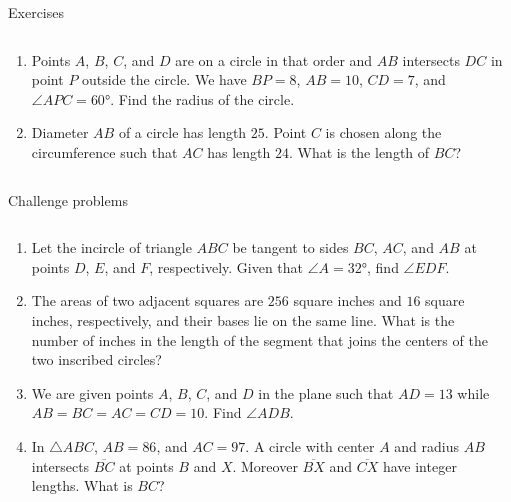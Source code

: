 \documentclass[9pt,aspectratio=169]{beamer}
\begin{document}
\begin{frame}{Exercises}
\begin{columns}[T]
\begin{column}{0.5\textwidth}
\begin{enumerate}
        \item Points $A$, $B$, $C$, and $D$ are on a circle in that order and $AB$ intersects $DC$ in point $P$ outside the circle. We have $BP = 8$, $AB = 10$, $CD = 7$, and $\angle APC = 60°$. Find the radius of the circle.
        \item Diameter $AB$ of a circle has length $25$.  Point $C$ is chosen along the circumference such that $AC$ has length $24$.  What is the length of $BC$?     
      \end{enumerate}
    \end{column}
  \end{columns}
\end{frame}

\begin{frame}{Challenge problems}
  \begin{columns}[T]
    \begin{column}{0.5\textwidth}
      \begin{enumerate}
        \item Let the incircle of triangle $ABC$ be tangent to sides $BC$, $AC$, and $AB$ at points $D$, $E$, and $F$, respectively. Given that $\angle A = 32°$, find $\angle EDF$.
        \item The areas of two adjacent squares are $256$ square inches and $16$ square inches,
        respectively, and their bases lie on the same line. What is the number of inches in
        the length of the segment that joins the centers of the two inscribed circles? 
        \item We are given points $A$, $B$, $C$, and $D$ in the plane such that $AD = 13$ while $AB = BC = AC= CD = 10$. Find $\angle ADB$.
        \item In $\triangle ABC$, $AB = 86$, and $AC=97$. A circle with center $A$ and radius $AB$ intersects $\overline{BC}$ at points $B$ and $X$. Moreover $\overline{BX}$ and $\overline{CX}$ have integer lengths. What is $BC$?
      \end{enumerate}
    \end{column}
    \begin{column}{0.5\textwidth}
    \end{column}
  \end{columns}
\end{frame}

\end{document}
